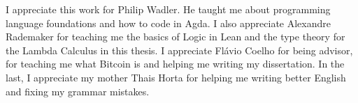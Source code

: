 \subtitle{Acknowledgment}

I appreciate this work for Philip Wadler.
He taught me about programming language foundations and how to code in Agda.
I also appreciate Alexandre Rademaker for teaching me the basics of Logic in Lean
and the type theory for the Lambda Calculus in this thesis.
I appreciate Flávio Coelho for being advisor, for teaching me what Bitcoin is
and helping me writing my dissertation.
In the last, I appreciate my mother Thais Horta for helping me writing better English
and fixing my grammar mistakes.
